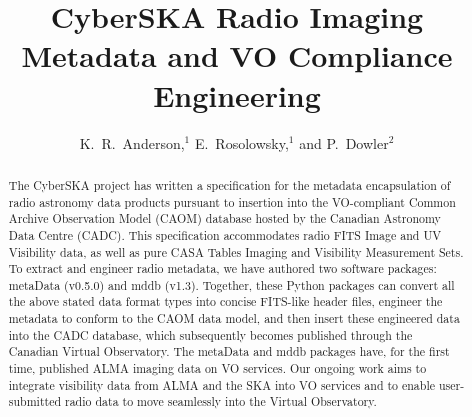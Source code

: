 
\resetcounters





\title{CyberSKA Radio Imaging Metadata and VO Compliance Engineering}
\author{K.~R.~Anderson,$^1$ E.~Rosolowsky,$^1$ and P.~Dowler$^2$
}


\begin{abstract}
The CyberSKA project has written a specification for the metadata encapsulation of radio astronomy data products pursuant to insertion into the VO-compliant Common Archive Observation Model (CAOM) database hosted by the Canadian Astronomy Data Centre (CADC). This specification accommodates radio FITS Image and UV Visibility data, as well as pure CASA Tables Imaging and Visibility Measurement Sets. To extract and engineer radio metadata, we have authored two software packages: metaData (v0.5.0) and mddb (v1.3). Together, these Python packages can convert all the above stated data format types into concise FITS-like header files, engineer the metadata to conform to the CAOM data model, and then insert these engineered data into the CADC database, which subsequently becomes published through the Canadian Virtual Observatory. The metaData and mddb packages have, for the first time, published ALMA imaging data on VO services. Our ongoing work aims to integrate visibility data from ALMA and the SKA into VO services and to enable user-submitted radio data to move seamlessly into the Virtual Observatory. 
\end{abstract}

